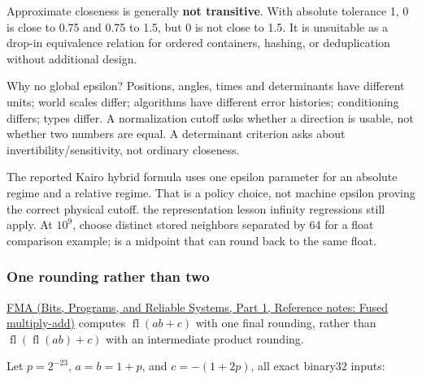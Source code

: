 Approximate closeness is generally \textbf{not transitive}. With absolute tolerance 1, 0 is close to 0.75 and 0.75 to 1.5, but 0 is not close to 1.5. It is unsuitable as a drop-in equivalence relation for ordered containers, hashing, or deduplication without additional design.

Why no global epsilon? Positions, angles, times and determinants have different units; world scales differ; algorithms have different error histories; conditioning differs; types differ. A normalization cutoff asks whether a direction is usable, not whether two numbers are equal. A determinant criterion asks about invertibility/sensitivity, not ordinary closeness.

The reported Kairo hybrid formula uses one epsilon parameter for an absolute regime and a relative regime. That is a policy choice, not machine epsilon proving the correct physical cutoff. the representation lesson infinity regressions still apply. At \(10^9\), choose distinct stored neighbors separated by 64 for a float comparison example;  is a midpoint that can round back to the same float.

\subsubsection{One rounding rather than two}\label{05-engine-i-ch001-one-rounding-rather-than-two}

\hypertarget{05-engine-i-ch001-one-rounding-rather-than-two}{}

\href{../01-Bits-Programs-and-Reliable-Systems-P01/main.pdf\#nameddest=appendix-41e8ef22a21e}{FMA (Bits, Programs, and Reliable Systems, Part 1, Reference notes: Fused multiply-add)} computes \(\operatorname{fl}(ab+c)\) with one final rounding, rather than \(\operatorname{fl}(\operatorname{fl}(ab)+c)\) with an intermediate product rounding.

Let \(p=2^{-23}\), \(a=b=1+p\), and \(c=-(1+2p)\), all exact binary32 inputs:

